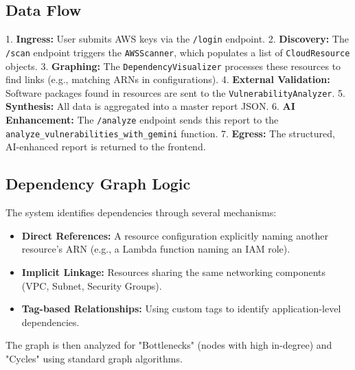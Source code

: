 \subsection{Data Flow}
1. \textbf{Ingress:} User submits AWS keys via the \texttt{/login} endpoint.
2. \textbf{Discovery:} The \texttt{/scan} endpoint triggers the \texttt{AWSScanner}, which populates a list of \texttt{CloudResource} objects.
3. \textbf{Graphing:} The \texttt{DependencyVisualizer} processes these resources to find links (e.g., matching ARNs in configurations).
4. \textbf{External Validation:} Software packages found in resources are sent to the \texttt{VulnerabilityAnalyzer}.
5. \textbf{Synthesis:} All data is aggregated into a master report JSON.
6. \textbf{AI Enhancement:} The \texttt{/analyze} endpoint sends this report to the \texttt{analyze_vulnerabilities_with_gemini} function.
7. \textbf{Egress:} The structured, AI-enhanced report is returned to the frontend.

\subsection{Dependency Graph Logic}
The system identifies dependencies through several mechanisms:
\begin{itemize}
    \item \textbf{Direct References:} A resource configuration explicitly naming another resource's ARN (e.g., a Lambda function naming an IAM role).
    \item \textbf{Implicit Linkage:} Resources sharing the same networking components (VPC, Subnet, Security Groups).
    \item \textbf{Tag-based Relationships:} Using custom tags to identify application-level dependencies.
\end{itemize}
The graph is then analyzed for "Bottlenecks" (nodes with high in-degree) and "Cycles" using standard graph algorithms.
